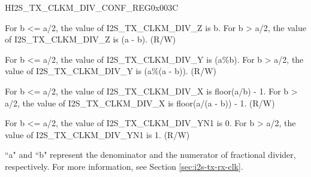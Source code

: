 \begin{register}{H}{I2S\_TX\_CLKM\_DIV\_CONF\_REG}{0x003C}\label{regdesc:I2STXCLKMDIVCONFREG}
%
%
%
%
%
\regnewline%
\begin{regdesc}\begin{reglist}
\label{fielddesc:I2STXCLKMDIVZ}\item [I2S\_TX\_CLKM\_DIV\_Z] For b <= a/2, the value of I2S\_TX\_CLKM\_DIV\_Z is b. For b > a/2, the value of I2S\_TX\_CLKM\_DIV\_Z is (a - b). (R/W)
\label{fielddesc:I2STXCLKMDIVY}\item [I2S\_TX\_CLKM\_DIV\_Y] For b <= a/2, the value of I2S\_TX\_CLKM\_DIV\_Y is (a\%b). For b > a/2, the value of I2S\_TX\_CLKM\_DIV\_Y is (a\%(a - b)). (R/W)
\label{fielddesc:I2STXCLKMDIVX}\item [I2S\_TX\_CLKM\_DIV\_X] For b <= a/2, the value of I2S\_TX\_CLKM\_DIV\_X is floor(a/b) - 1. For b > a/2, the value of I2S\_TX\_CLKM\_DIV\_X is floor(a/(a - b)) - 1. (R/W)
\label{fielddesc:I2STXCLKMDIVYN1}\item [I2S\_TX\_CLKM\_DIV\_YN1] For b <= a/2, the value of I2S\_TX\_CLKM\_DIV\_YN1 is 0. For b > a/2, the value of I2S\_TX\_CLKM\_DIV\_YN1 is 1. (R/W)
\end{reglist}\end{regdesc}
\vspace{-2em}
\begin{tiplisting}
``a" and ``b" represent the denominator and the numerator of fractional divider, respectively. For more information, see Section \ref{sec:i2s-tx-rx-clk}.
\end{tiplisting}
\end{register}


